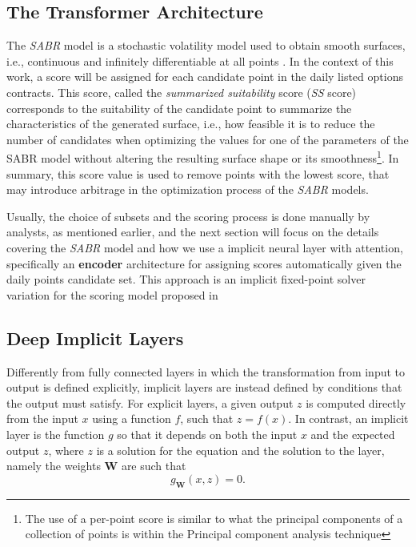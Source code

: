 \subsection{The Transformer Architecture}
The \textit{SABR} model is a stochastic volatility model used to obtain smooth surfaces, i.e., continuous and infinitely differentiable at all points \citep{Hagan2015}. In the context of this work, a score will be assigned for each candidate point in the daily listed options contracts. This score, called the \textit{summarized suitability} score (\textit{SS} score) corresponds to the suitability of the candidate point to summarize the characteristics of the generated surface, i.e., how feasible it is to reduce the number of candidates when optimizing the values for one of the parameters of the SABR model without altering the resulting surface shape or its smoothness\footnote{The use of a per-point score is similar to what the principal components of a collection of points is within the Principal component analysis technique}. In summary, this score value is used to remove points with the lowest score, that may introduce arbitrage in the optimization process of the \textit{SABR} models.

Usually, the choice of subsets and the scoring process is done manually by analysts, as mentioned earlier, and the next section will focus on the details covering the \textit{SABR} model and how we use a implicit neural layer with attention, specifically an \textbf{encoder} architecture for assigning scores automatically given the daily points candidate set. This approach is an implicit fixed-point solver variation for the scoring model proposed in \citep{Kim2021}

\subsection{Deep Implicit Layers}
Differently from fully connected layers in which the transformation from input to output is defined explicitly, implicit layers are instead defined by conditions that the output must satisfy. For explicit layers, a given output $z$ is computed directly from the input $x$ using a function $f$, such that $z = f(x)$. In contrast, an implicit layer is the function $g$ so that it depends on both the input $x$ and the expected output $z$, where $z$ is a solution for the equation and the solution to the layer, namely the weights $\mathbf{W}$ are such that
\begin{equation}\label{fixed_point}
	g_{\mathbf{W}}(x, z) = 0.
\end{equation}

